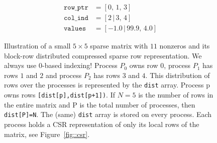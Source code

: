 \documentclass{article}
\begin{document}
\begin{figure}
\begin{center}
\begin{minipage}{.3\textwidth}
\begin{align*}
        \texttt{row\_ptr} &= [ 0, \, 1, \, 3 ] \\
        \texttt{col\_ind} &= [ 2  \,| \, 3, \, 4 ] \\
        \texttt{values} &= [ -1.0 \,| \, 99.9, \, 4.0 ]
      \end{align*}
    \end{minipage}
  \end{center}
  \caption{Illustration of a small $5 \times 5$ sparse matrix with
    $11$ nonzeros and its block-row distributed compressed sparse row
    representation. We always use $0$-based indexing! Process $P_0$
    owns row $0$, process $P_1$ has rows $1$ and $2$ and process $P_2$
    has rows $3$ and $4$. This distribution of rows over the processes
    is represented by the \texttt{dist} array. Process p owns rows
    \texttt{[dist[p],dist[p+1])}. If $N=5$ is the number of rows in
    the entire matrix and P is the total number of processes, then
    \texttt{dist[P]=N}. The (same) \texttt{dist} array is stored on
    every process. Each process holds a CSR representation of only its
    local rows of the matrix, see Figure~\ref{fig::csr}.}
  \label{fig::block-row-csr}
\end{figure}
\end{document}

